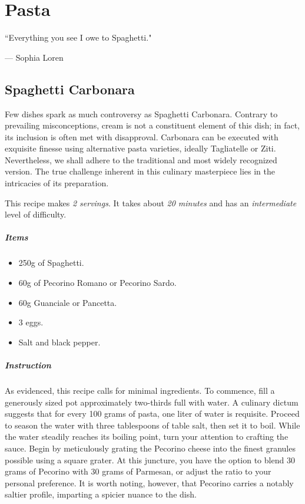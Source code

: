 \chapter{Pasta}
\label{pasta}
\epigraph{``Everything you see I owe to Spaghetti."}{--- \textup{Sophia Loren}}

\clearpage
\section{Spaghetti Carbonara}
\label{Spaghetticarbonara}
Few dishes spark as much controversy as Spaghetti Carbonara. Contrary to prevailing misconceptions, cream is not a constituent element of this dish; in fact, its inclusion is often met with disapproval. Carbonara can be executed with exquisite finesse using alternative pasta varieties, ideally Tagliatelle or Ziti. Nevertheless, we shall adhere to the traditional and most widely recognized version. The true challenge inherent in this culinary masterpiece lies in the intricacies of its preparation.

This recipe makes \emph{2 servings}. It takes about \emph{20 minutes} and has an \emph{intermediate} level of difficulty. 

\paragraph{Items}
\begin{itemize}[noitemsep]
    \item[\ding{182}] 250g of Spaghetti.
    \item[\ding{183}] 60g of Pecorino Romano or Pecorino Sardo.
    \item[\ding{184}] 60g Guanciale or Pancetta.
    \item[\ding{185}] 3 eggs.
    \item[\ding{186}] Salt and black pepper.
\end{itemize}

\paragraph{Instruction} 
As evidenced, this recipe calls for minimal ingredients. To commence, fill a generously sized pot approximately two-thirds full with water. A culinary dictum suggests that for every 100 grams of pasta, one liter of water is requisite. Proceed to season the water with three tablespoons of table salt, then set it to boil. While the water steadily reaches its boiling point, turn your attention to crafting the sauce. Begin by meticulously grating the Pecorino cheese into the finest granules possible using a square grater. At this juncture, you have the option to blend 30 grams of Pecorino with 30 grams of Parmesan, or adjust the ratio to your personal preference. It is worth noting, however, that Pecorino carries a notably saltier profile, imparting a spicier nuance to the dish.

